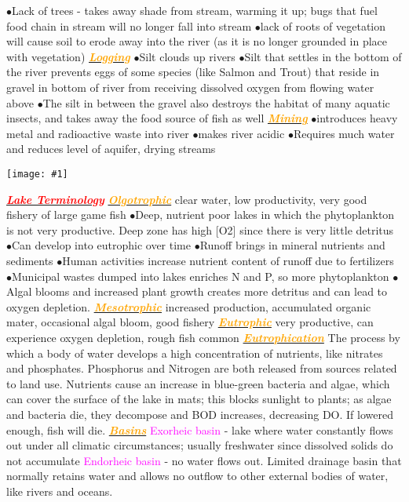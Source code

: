 \documentclass{article}
\newcommand{\ddd}{$\bullet$}
\newcommand{\red}[1]{\textcolor{red}{#1}}
\newcommand{\pink}[1]{\textcolor{magenta}{#1}}
\newcommand{\orange}[1]{\textcolor{orange}{#1}}
\newcommand{\mysection}[1]{\underline{{\textbf{\textit{\red{#1}}}}}}
\newcommand{\mysubsection}[1]{\underline{\textbf{{\textit{\orange{#1}}}}}}
\newcommand{\vocab}[1]{{\pink{#1}}}
\newcommand{\fig}[1]{
	\texttt{[image: \#1]}
}
\begin{document}
\begin{multicols*}{4}
            \ddd Lack of trees - takes away shade from stream, warming it up; bugs that fuel food chain in stream will no longer fall into stream
            \ddd lack of roots of vegetation will cause soil to erode away into the river (as it is no longer grounded in place with vegetation) 
        \mysubsection{Logging}
            \ddd Silt clouds up rivers
            \ddd Silt that settles in the bottom of the river prevents eggs of some species (like Salmon and Trout) that reside in gravel in bottom of river from receiving dissolved oxygen from flowing water above
            \ddd The silt in between the gravel also destroys the habitat of many aquatic insects, and takes away the food source of fish as well
        \mysubsection{Mining}
            \ddd introduces heavy metal and radioactive waste into river
            \ddd makes river acidic
            \ddd Requires much water and reduces level of aquifer, drying streams
    \fig{turny}
    \mysection{Lake Terminology}
        \mysubsection{Olgotrophic} clear water, low productivity, very good fishery of large game fish
            \ddd Deep, nutrient poor lakes in which the phytoplankton is not very productive. Deep zone has high [O2] since there is very little detritus
            \ddd Can develop into eutrophic over time
            \ddd Runoff brings in mineral nutrients and sediments
            \ddd Human activities increase nutrient content of runoff due to fertilizers
            \ddd Municipal wastes dumped into lakes enriches N and P, so more phytoplankton
            \ddd Algal blooms and increased plant growth creates more detritus and can lead to oxygen depletion.
        \mysubsection{Mesotrophic} increased production, accumulated organic mater, occasional algal bloom, good fishery
        \mysubsection{Eutrophic} very productive, can experience oxygen depletion, rough fish common
        \mysubsection{Eutrophication} 
        	The process by which a body of water develops a high concentration of nutrients, like nitrates and phosphates. Phosphorus and Nitrogen are both released from sources related to land use. Nutrients cause an increase in blue-green bacteria and algae, which can cover the surface of the lake in mats; this blocks sunlight to plants; as algae and bacteria die, they decompose and BOD increases, decreasing DO. If lowered enough, fish will die.
       \mysubsection{Basins}
       		\vocab{Exorheic basin} - lake where water constantly flows out under all climatic circumstances; usually freshwater since dissolved solids do not accumulate
       		\vocab{Endorheic basin} - no water flows out. Limited drainage basin that normally retains water and allows no outflow to other external bodies of water, like rivers and oceans.

\end{multicols*}
\end{document}
